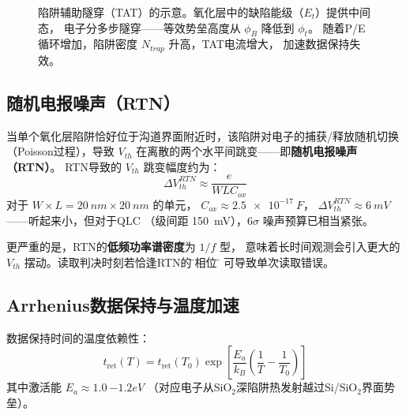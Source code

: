 \documentclass[11pt,a4paper,twoside]{article}
\theoremstyle{definition}
\theoremstyle{plain}
\theoremstyle{remark}
\begin{document}
\begin{figure}[H]
\centering
{}
\caption{陷阱辅助隧穿（TAT）的示意。氧化层中的缺陷能级（$E_t$）提供中间态，
电子分多步隧穿——等效势垒高度从 $\phi_B$ 降低到 $\phi_t$。
随着P/E循环增加，陷阱密度 $N_{trap}$ 升高，TAT电流增大，
加速数据保持失效。}
\label{fig:tat}
\end{figure}

\subsection{随机电报噪声（RTN）}

当单个氧化层陷阱恰好位于沟道界面附近时，该陷阱对电子的捕获/释放随机切换
（Poisson过程），导致 $V_{th}$ 在离散的两个水平间跳变——即\textbf{随机电报噪声（RTN）}。
RTN导致的 $V_{th}$ 跳变幅度约为：
\begin{equation}
  \Delta V_{th}^{RTN} \approx \frac{e}{W L C_{ox}}
\end{equation}
对于 $W \times L = \SI{20}{nm} \times \SI{20}{nm}$ 的单元，
$C_{ox} \approx \SI{2.5e-17}{F}$，
$\Delta V_{th}^{RTN} \approx \SI{6}{mV}$——听起来小，但对于QLC
（级间距 \SI{150}{mV}），$6\sigma$ 噪声预算已相当紧张。

更严重的是，RTN的\textbf{低频功率谱密度}为 $1/f$ 型，
意味着长时间观测会引入更大的 $V_{th}$ 摆动。读取判决时刻若恰逢RTN的\"坏相位\"，
可导致单次读取错误。

\subsection{Arrhenius数据保持与温度加速}

数据保持时间的温度依赖性：
\begin{equation}\label{eq:arrhenius}
  t_{\text{ret}}(T) = t_{\text{ret}}(T_0)
  \exp\!\left[ \frac{E_a}{k_B}
            \left( \frac{1}{T} - \frac{1}{T_0} \right) \right]
\end{equation}
其中激活能 $E_a \approx \SI{1.0}{-1.2}{eV}$
（对应电子从SiO$_2$深陷阱热发射越过Si/SiO$_2$界面势垒）。
\end{document}
